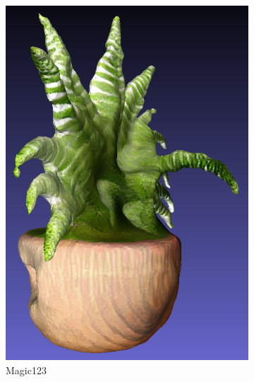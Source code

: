 \begin{figure}[ht]
    \centering
    \begin{subfigure}[b]{0.2\textwidth}
        \centering
        \includegraphics[width=\textwidth]{etc/a high-quality rendering of a fern in a wooden pot/magic123/magic123_fern_side_result.png}
        \caption{Magic123}
    \end{subfigure}
    \begin{subfigure}[b]{0.32\textwidth}
        \centering

\end{subfigure}
\end{figure}
